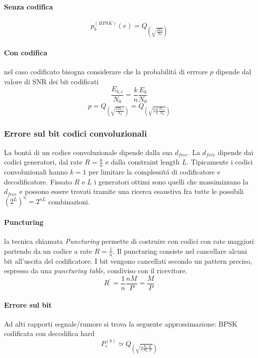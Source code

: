             \paragraph{Senza codifica}
                \[
                    p_b^{(BPSK)}(e) = Q_{\displaystyle\left(\sqrt{\frac{2E_b}{N_0}}\right)}  
                \]
            \paragraph{Con codifica}
                nel caso codificato bisogna considerare che la probabilitá di errrore $p$ dipende dal valore di SNR dei bit codificati
                \[
                    \frac{E_{b,c}}{N_0} = \frac{k}{n} \frac{E_b}{N_0}    
                \]
                \[
                    p = Q_{\displaystyle\left(\sqrt{\frac{2E_{b,c}}{N_0}}\right)} = Q_{\displaystyle\left(\sqrt{2\frac{k}{n}\frac{E_{b,c}}{N_0}}\right)} 
                \]
        \subsubsection{Errore sul bit codici convoluzionali}
            La bontá di un codice convoluzionale dipende dalla sua $d_{free}$. La $d_{free}$ dipende
            dai codici generatori, dal rate $R= \frac{k}{n}$ e dalla constraint length $L$. Tipicamente i 
            codici convoluzionali hanno $k=1$ per limitare la complessitá di codificatore e decodificatore. 
            Fissato $R$ e $L$ i generatori ottimi sono quelli che massimizzano la $d_{free}$ e possono essere trovati 
            tramite una ricerca esaustiva fra tutte le possibili $\left(2^L\right)^n = 2^{nL}$ combinazioni.
            \paragraph{Puncturing}
                la tecnica chiamata \emph{Puncturing} permette di costruire con codici con rate maggiori partendo da un codice
                a rate $R=\frac{1}{n}$. Il puncturing consiste nel cancellare alcuni bit all'uscita del codificatore.
                I bit vengono cancellati secondo un pattern preciso, espresso da una \emph{puncturing table}, condiviso
                con il ricevitore.
                \[
                    R^\prime = \frac{1}{n} \frac{nM}{P}=\frac{M}{P}  
                \]
            \paragraph{Errore sul bit}
                Ad alti rapporti segnale/rumore si trova la seguente approssimazione: BPSK codificata con 
                decodifica hard
                \[
                    P_e^{(b)} \simeq Q_{\displaystyle \left(\sqrt{2\frac{E_b}{N_0}\frac{R^\prime}{2}}\right)}  
                \] 
